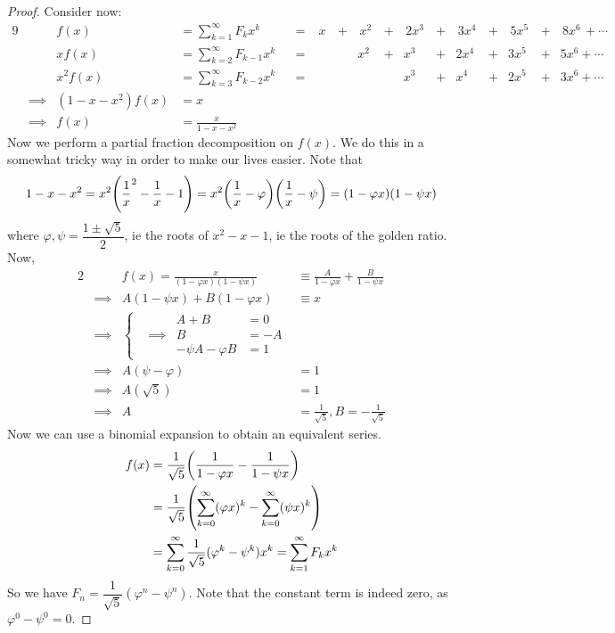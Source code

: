 \documentclass[fleqn,a4paper,11pt]{article}
\begin{document}
\begin{proof}
    Consider now:
    \begin{alignat*}{9}
    && f(x) &= \sum_{k = 1}^\infty F_k x^k
        &&=&\; x\, &+&\, x^2\, &+&\, 2x^3\, &+&\,
            3x^4\, &+&\, 5x^5\, &+&\, 8x^6\, + \dotsb \\
    && x f(x) &= \sum_{k = 2}^\infty F_{k - 1} x^k
        &&=& &&x^2 &+& x^3 &+& 2x^4 &+& 3x^5 &+& 5x^6 + \dotsb \\
    && x^2 f(x) &= \sum_{k = 3}^\infty F_{k - 2}x^k
        &&=& &&&& x^3 &+& x^4 &+& 2x^5 &+& 3x^6 + \dotsb \\
    &\implies& (1 - x - x^2) f(x) &= x \\
    &\implies& f(x) &= \frac x{1 - x - x^2}
    \end{alignat*}
    Now we perform a partial fraction decomposition on \(f(x)\). We do this in a
    somewhat tricky way in order to make our lives easier. Note that
    \begin{equation*}
    1 - x - x^2 = x^2 \pqty{\frac 1x^2 - \frac 1x - 1}
        = x^2\pqty{\frac 1x - \varphi}\pqty{\frac 1x - \psi}
        = (1 - \varphi x)(1 - \psi x)
    \end{equation*}
    where \(\varphi, \psi = \dfrac{1 \pm \sqrt 5}2\), ie the roots of
    \(x^2 - x - 1\), ie the roots of the golden ratio. Now,
    \begin{alignat*}{2}
    && f(x) = \frac x{(1 - \varphi x)(1 - \psi x)}
        &\equiv \frac A{1 - \varphi x} + \frac B{1 - \psi x} \\
    &\implies& A(1 - \psi x) + B(1 - \varphi x) &\equiv x \\
    &\implies& \left\{
        \begin{aligned}
            && A + B &= 0 \\
            &\implies& B &= -A  \\
            && -\psi A - \varphi B &= 1
        \end{aligned} \right. \\
    &\implies& A(\psi - \varphi) &= 1 \\
    &\implies& A(\sqrt 5) &= 1 \\
    &\implies& A &= \frac 1{\sqrt 5}, B = -\frac 1{\sqrt 5}
    \end{alignat*}
    Now we can use a binomial expansion to obtain an equivalent series.
    \begin{align*}
    f(x) &= \frac 1{\sqrt 5}\pqty{\frac 1{1 - \varphi x}
                                - \frac 1{1 - \psi x}} \\
    &= \frac 1{\sqrt 5}\pqty{\sum_{k = 0}^\infty (\varphi x)^k
                           - \sum_{k = 0}^\infty (\psi x)^k} \\
    &= \sum_{k = 0}^\infty \frac 1{\sqrt 5}(\varphi^k - \psi^k)x^k
    = \sum_{k = 1}^\infty F_k x^k
    \end{align*}
    So we have \(F_n = \dfrac 1{\sqrt 5}(\varphi^n - \psi^n)\). Note that the
    constant term is indeed zero, as \(\varphi^0 - \psi^0 = 0\).
    \end{proof}
\end{document}
